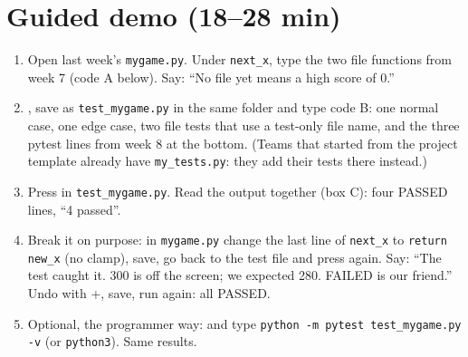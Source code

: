 \section{Guided demo (18--28 min)}
\begin{workedexample}
\begin{enumerate}
  \item Open last week's \texttt{mygame.py}. Under \texttt{next\_x}, type the two file functions from week 7 (code A below). Say: \enquote{No file yet means a high score of 0.}
  \item {}, save as \texttt{test\_mygame.py} in the same folder and type code B: one normal case, one edge case, two file tests that use a test-only file name, and the three pytest lines from week 8 at the bottom. (Teams that started from the project template already have \texttt{my\_tests.py}: they add their tests there instead.)
  \item Press  in \texttt{test\_mygame.py}. Read the output together (box C): four PASSED lines, \enquote{4 passed}.
  \item Break it on purpose: in \texttt{mygame.py} change the last line of \texttt{next\_x} to \texttt{return new\_x} (no clamp), save, go back to the test file and press  again. Say: \enquote{The test caught it. 300 is off the screen; we expected 280. FAILED is our friend.} Undo with +, save, run again: all PASSED.
  \item Optional, the programmer way:  and type \texttt{python -m pytest test\_mygame.py -v} (or \texttt{python3}). Same results.
\end{enumerate}
\end{workedexample}

